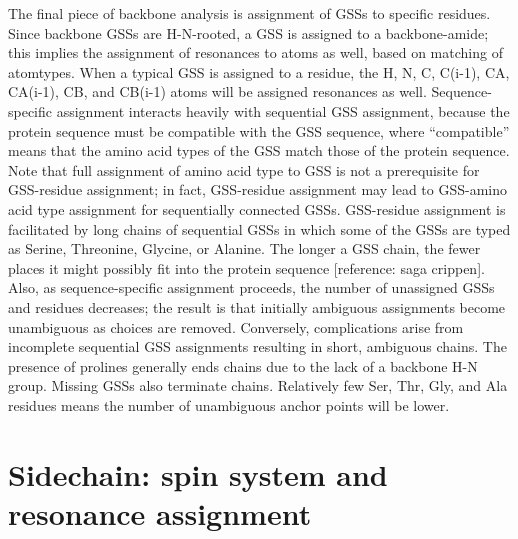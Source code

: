 The final piece of backbone analysis is assignment of GSSs to specific 
residues.  Since backbone GSSs are H-N-rooted, a GSS is assigned to a 
backbone-amide; this implies the assignment of resonances to atoms as well, 
based on matching of atomtypes.  When a typical GSS is assigned to a residue, 
the H, N, C, C(i-1), CA, CA(i-1), CB, and CB(i-1) atoms will be assigned 
resonances as well.  Sequence-specific assignment interacts heavily with 
sequential GSS assignment, because the protein sequence must be compatible 
with the GSS sequence, where “compatible” means that the amino acid types 
of the GSS match those of the protein sequence.  Note that full assignment 
of amino acid type to GSS is not a prerequisite for GSS-residue assignment; 
in fact, GSS-residue assignment may lead to GSS-amino acid type assignment 
for sequentially connected GSSs.  GSS-residue assignment is facilitated by 
long chains of sequential GSSs in which some of the GSSs are typed as Serine, 
Threonine, Glycine, or Alanine.  The longer a GSS chain, the fewer places it 
might possibly fit into the protein sequence [reference: saga crippen].  Also, 
as sequence-specific assignment proceeds, the number of unassigned GSSs and 
residues decreases; the result is that initially ambiguous assignments become 
unambiguous as choices are removed.  Conversely, complications arise from 
incomplete sequential GSS assignments resulting in short, ambiguous chains.  
The presence of prolines generally ends chains due to the lack of a backbone 
H-N group.  Missing GSSs also terminate chains.  Relatively few Ser, Thr, Gly, 
and Ala residues means the number of unambiguous anchor points will be lower.


\section{Sidechain: spin system and resonance assignment}

